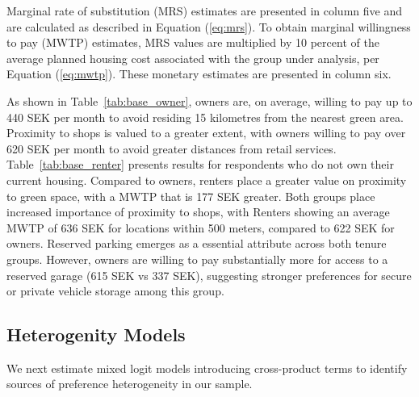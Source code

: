\documentclass[3p,11pt ]{elsarticle}
\begin{document}
Marginal rate of substitution (MRS) estimates are presented in column five and are calculated as described in Equation (\ref{eq:mrs}).
To obtain marginal willingness to pay (MWTP) estimates,
MRS values are multiplied by 10 percent of the average planned housing cost associated with the group under analysis, per Equation (\ref{eq:mwtp}). These monetary estimates are presented in column six.

As shown in Table~\ref{tab:base_owner},
owners are, on average, willing to pay up to 440 SEK per month to avoid residing 15 kilometres from the nearest green area.
Proximity to shops is valued to a greater extent, with owners willing to pay over 620 SEK per month to avoid greater distances from retail services.
Table~\ref{tab:base_renter} presents results for respondents who do not own their current housing.
Compared to owners,
renters place a greater value on proximity to green space, with a MWTP that is 177 SEK greater.
Both groups place increased importance of proximity to shops, with Renters showing an average MWTP of 636 SEK for locations within 500 meters, compared to 622 SEK for owners.
Reserved parking emerges as a essential attribute across both tenure groups.
However, owners are willing to pay substantially more for access to a reserved garage (615 SEK vs 337 SEK),
suggesting stronger preferences for secure or private vehicle storage among this group.














\clearpage




\subsection{Heterogenity Models}

We next estimate mixed logit models introducing cross-product terms to identify sources of preference heterogeneity in our sample.
\end{document}
